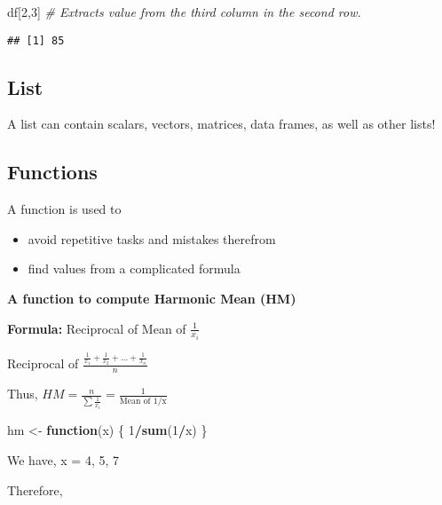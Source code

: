 \documentclass[
]{book}
\newenvironment{Shaded}{\begin{snugshade}}{\end{snugshade}}
\newcommand{\CommentTok}[1]{\textcolor[rgb]{0.56,0.35,0.01}{\textit{#1}}}
\newcommand{\ControlFlowTok}[1]{\textcolor[rgb]{0.13,0.29,0.53}{\textbf{#1}}}
\newcommand{\DecValTok}[1]{\textcolor[rgb]{0.00,0.00,0.81}{#1}}
\newcommand{\KeywordTok}[1]{\textcolor[rgb]{0.13,0.29,0.53}{\textbf{#1}}}
\newcommand{\NormalTok}[1]{#1}
\newcommand{\OperatorTok}[1]{\textcolor[rgb]{0.81,0.36,0.00}{\textbf{#1}}}
\newcommand{\StringTok}[1]{\textcolor[rgb]{0.31,0.60,0.02}{#1}}
\providecommand{\tightlist}{%
  \setlength{\itemsep}{0pt}\setlength{\parskip}{0pt}}
\begin{document}
\begin{Shaded}
\begin{Highlighting}[]
\NormalTok{df[}\DecValTok{2}\NormalTok{,}\DecValTok{3}\NormalTok{] }\CommentTok{# Extracts value from the third column in the second row. }
\end{Highlighting}
\end{Shaded}

\begin{verbatim}
## [1] 85
\end{verbatim}

\hypertarget{list}{%
\subsection{List}\label{list}}

A list can contain scalars, vectors, matrices, data frames, as well as other lists!

\hypertarget{functions}{%
\subsection{Functions}\label{functions}}

A function is used to

\begin{itemize}
\tightlist
\item
  avoid repetitive tasks and mistakes therefrom
\item
  find values from a complicated formula
\end{itemize}

\textbf{A function to compute Harmonic Mean (HM)}

\textbf{Formula:} Reciprocal of Mean of \(\frac{1}{x_i}\)

Reciprocal of \(\frac{\frac{1}{x_1}+\frac{1}{x_2}+...+\frac{1}{x_n}}{n}\)

Thus, \(HM = \frac{n}{\sum \frac{1}{x_i}} =\frac 1 {\text{Mean of 1/x}}\)

\begin{Shaded}
\begin{Highlighting}[]
\NormalTok{hm <-}\StringTok{ }\ControlFlowTok{function}\NormalTok{(x) \{}
  \DecValTok{1}\OperatorTok{/}\KeywordTok{sum}\NormalTok{(}\DecValTok{1}\OperatorTok{/}\NormalTok{x)}
\NormalTok{\}}
\end{Highlighting}
\end{Shaded}

We have, x = 4, 5, 7

Therefore,
\end{document}
